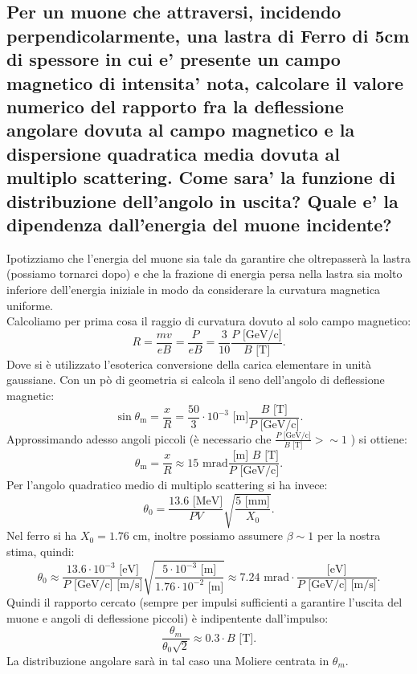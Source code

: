 \subsection[\hspace{1mm} ]{Per un muone che attraversi, incidendo perpendicolarmente, una lastra di Ferro di 5cm di spessore in cui e' presente un campo magnetico di intensita' nota, calcolare il valore numerico del rapporto fra la deflessione angolare dovuta al campo magnetico e la dispersione quadratica media dovuta al multiplo scattering. Come sara’ la funzione di distribuzione dell’angolo in uscita? Quale e’ la dipendenza dall’energia del muone incidente?
}
\label{sec:4.b.20}
Ipotizziamo che l'energia del muone sia tale da garantire che oltrepasserà la lastra (possiamo tornarci dopo) e che la frazione di energia persa nella lastra sia molto inferiore dell'energia iniziale in modo da considerare la curvatura magnetica uniforme.\\
Calcoliamo per prima cosa il raggio di curvatura dovuto al solo campo magnetico:
\[
	R= \frac{mv}{eB}= \frac{P}{e B} = \frac{3}{10} \frac{P  \text{ [GeV/c]}}{B \text{ [T]}}
.\] 
Dove si è utilizzato l'esoterica conversione della carica elementare in unità gaussiane. Con un pò di geometria si calcola il seno dell'angolo di deflessione magnetic:
\[
	\sin\theta_{\text{m}}= \frac{x}{R} = \frac{50}{3} \cdot 10^{-3}\text{ [m]}  \frac{B \text{ [T]}}{P  \text{ [GeV/c]}}
.\] 
Approssimando adesso angoli piccoli (è necessario che $ \frac{P \text{ [GeV/c]}}{B \text{ [T]}}>\sim 1$ ) si ottiene:
\[
	\theta_{\text{m}}= \frac{x}{R} \approx 15 \text{ mrad}  \frac{\text{ [m] } B \text{ [T]}}{P  \text{ [GeV/c]}}
.\] 
Per l'angolo quadratico medio di multiplo scattering si ha invece:
\[
	\theta_0= \frac{13.6 \text{ [MeV]}}{PV} \sqrt{ \frac{5 \text{ [mm]}}{X_0}} 
.\] 
Nel ferro si ha $X_0 = 1.76$ cm, inoltre possiamo assumere $\beta \sim 1$ per la nostra stima, quindi:
\[
	\theta_0 \approx \frac{13.6 \cdot 10^{-3} \text{ [eV]}}{P \text{ [GeV/c] [m/s]}} \sqrt{ \frac{5 \cdot 10^{-3}\text{ [m]} }{1.76 \cdot 10^{-2}\text{ [m]}}}
	\approx 7.24 \text{ mrad} \cdot \frac{\text{[eV]}}{P\text{ [GeV/c] [m/s]} }
.\] 
Quindi il rapporto cercato (sempre per impulsi sufficienti a garantire l'uscita del muone e angoli di deflessione piccoli) è indipentente dall'impulso:
\[
	\frac{\theta_{m}}{\theta_0 \sqrt{2}} \approx 0.3\cdot B \text{ [T]}
.\]
La distribuzione angolare sarà in tal caso una Moliere centrata in $\theta_{m}$.

